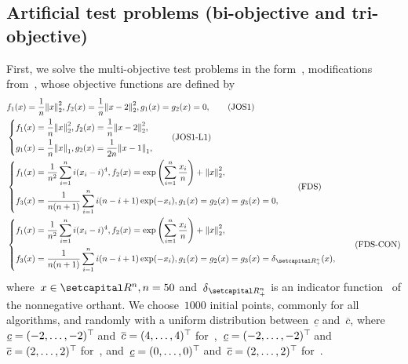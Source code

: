 \documentclass[../main]{subfiles}
\begin{document}
\subsection{Artificial test problems (bi-objective and tri-objective)}
First, we solve the multi-objective test problems in the form~, modifications from~\cite{Jin2001,Fliege2009}, whose objective functions are defined by
\begin{align}
     & f_1(x) = \frac{1}{n} \norm*{x}_2^2,
    f_2(x) = \frac{1}{n} \norm*{x - 2}_2^2,
    g_1(x) = g_2(x) = 0, \tag{JOS1}\label{eq:JOS1}                                         \\
     & \left\{
    \begin{aligned}
        f_1(x) & = \frac{1}{n} \norm*{x}_2^2,
        f_2(x) = \frac{1}{n} \norm*{x - 2}_2^2, \\
        g_1(x) & = \frac{1}{n} \norm*{x}_1,
        g_2(x) = \frac{1}{2n} \norm*{x - 1}_1,
    \end{aligned} \right.
    \label{eq:JOS1_L1} \tag{JOS1-L1}                                                       \\
     & \left\{\begin{aligned}
                  f_1(x) & = \frac{1}{n^2} \sum_{i = 1}^{n} i (x_i - i)^4,
                  f_2(x) = \exp \left( \sum_{i = 1}^{n} \frac{x_i}{n} \right) + \norm*{x}_2^2, \\
                  f_3(x) & = \frac{1}{n (n + 1)} \sum_{i = 1}^{n} i (n - i + 1) \exp (- x_i),
                  g_1(x) = g_2(x) = g_3(x) = 0,
              \end{aligned} \right. \label{eq:FDS} \tag{FDS} \\
     & \left\{\begin{aligned}
                  f_1(x) & = \frac{1}{n^2} \sum_{i = 1}^{n} i (x_i - i)^4,
                  f_2(x) = \exp \left( \sum_{i = 1}^{n} \frac{x_i}{n} \right) + \norm*{x}_2^2, \\
                  f_3(x) & = \frac{1}{n (n + 1)} \sum_{i = 1}^{n} i (n - i + 1) \exp (- x_i),
                  g_1(x) = g_2(x) = g_3(x) = \indicator_{\setRpos^n}(x),
              \end{aligned} \right.\label{eq:FDS_CONSTRAINED} \tag{FDS-CON}
\end{align}
where~$x \in \setR^n, n = 50$ and~$\indicator_{\setRpos^n}$ is an indicator function~ of the nonnegative orthant.
We choose~$1000$ initial points, commonly for all algorithms, and randomly with a uniform distribution between~$\underline{c}$ and~$\overline{c}$, where~$\underline{c} = (-2, \dots, -2)^\top\hspace{-1pt}$ and~$\overline{c} = (4, \dots, 4)^\top\hspace{-1pt}$ for~,~$\underline{c} = (-2, \dots, -2)^\top\hspace{-1pt}$ and~$\overline{c} = (2, \dots, 2)^\top\hspace{-1pt}$ for~, and~$\underline{c} = (0, \dots, 0)^\top\hspace{-1pt}$ and~$\overline{c} = (2, \dots, 2)^\top\hspace{-1pt}$ for~.
\end{document}
